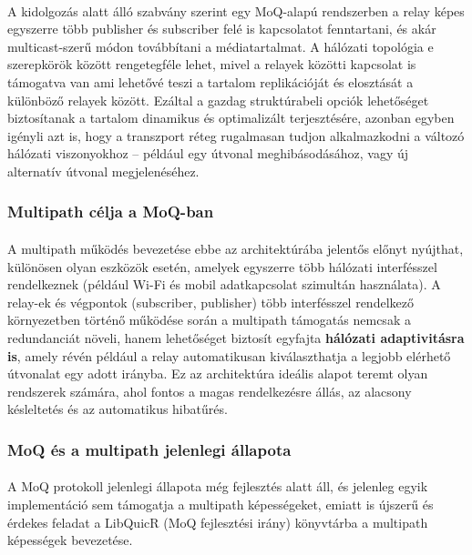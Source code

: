 \documentclass[a4paper,oneside]{article}
\begin{document}
\paragraph{}
A kidolgozás alatt álló szabvány szerint egy MoQ-alapú rendszerben a relay képes 
egyszerre több publisher és subscriber felé is kapcsolatot fenntartani, 
és akár multicast-szerű módon továbbítani a médiatartalmat. 
A hálózati topológia e szerepkörök között rengetegféle lehet, mivel 
a relayek közötti kapcsolat is támogatva van ami lehetővé teszi
a tartalom replikációját és elosztását a különböző relayek között. 
Ezáltal a gazdag struktúrabeli opciók lehetőséget biztosítanak a tartalom dinamikus 
és optimalizált terjesztésére, azonban egyben igényli azt is, hogy a transzport 
réteg rugalmasan tudjon alkalmazkodni a változó hálózati viszonyokhoz – például 
egy útvonal meghibásodásához, vagy új alternatív útvonal megjelenéséhez.

\subsubsection{Multipath célja a MoQ-ban}
\paragraph{}
A multipath működés bevezetése ebbe az architektúrába jelentős előnyt nyújthat, 
különösen olyan eszközök esetén, amelyek egyszerre több hálózati interfésszel 
rendelkeznek (például Wi-Fi és mobil adatkapcsolat szimultán használata). A relay-ek és végpontok 
(subscriber, publisher) több interfésszel rendelkező környezetben 
történő működése során a multipath támogatás nemcsak a redundanciát növeli, hanem 
lehetőséget biztosít egyfajta \textbf{hálózati adaptivitásra is}, amely révén például 
a relay automatikusan kiválaszthatja a legjobb elérhető útvonalat egy adott irányba. 
Ez az architektúra ideális alapot teremt olyan rendszerek számára, ahol fontos a magas 
rendelkezésre állás, az alacsony késleltetés és az automatikus hibatűrés.

\subsubsection{MoQ és a multipath jelenlegi állapota}
\paragraph{}
A MoQ protokoll jelenlegi állapota még fejlesztés alatt áll, és jelenleg egyik implementáció
sem támogatja a multipath képességeket, emiatt is újszerű és érdekes feladat
a LibQuicR \cite{libquicr}(MoQ fejlesztési irány) könyvtárba a multipath képességek bevezetése.
\end{document}
